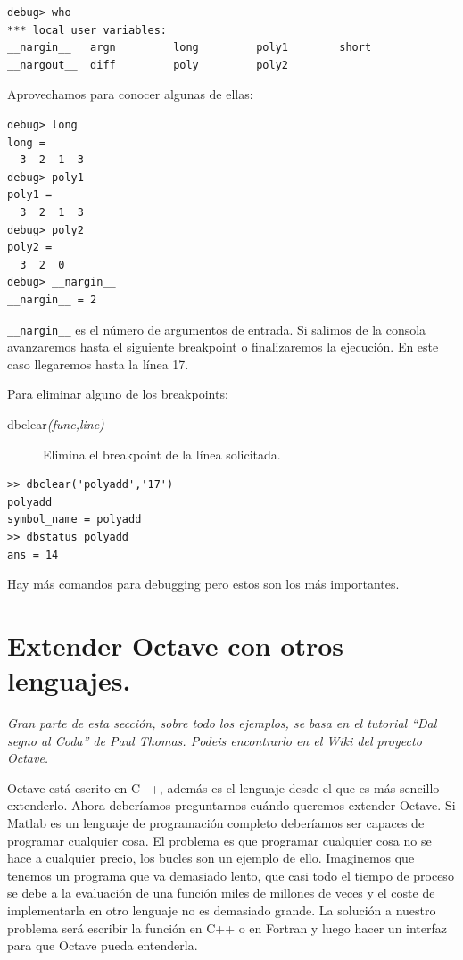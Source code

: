   \begin{verbatim}
debug> who
*** local user variables:
__nargin__   argn         long         poly1        short
__nargout__  diff         poly         poly2
\end{verbatim}
Aprovechamos para conocer algunas de ellas:

  \begin{verbatim}
debug> long
long =
  3  2  1  3
debug> poly1
poly1 =
  3  2  1  3
debug> poly2
poly2 =
  3  2  0
debug> __nargin__
__nargin__ = 2
\end{verbatim}
\texttt{\_\_nargin\_\_} es el número de argumentos de entrada. Si
salimos de la consola avanzaremos hasta el siguiente breakpoint o
finalizaremos la ejecución. En este caso llegaremos hasta la línea 17.

Para eliminar alguno de los breakpoints:

\begin{description}
\item [{dbclear\textsl{(func,line)}}]Elimina el
  breakpoint de la línea solicitada.
\end{description}
\begin{verbatim}
>> dbclear('polyadd','17')
polyadd
symbol_name = polyadd
>> dbstatus polyadd
ans = 14
\end{verbatim}
Hay más comandos para debugging pero estos son los más importantes.


\section{Extender Octave con otros
  lenguajes.\label{sec:Extender-Octave-con}}

\emph{Gran parte de esta sección, sobre todo los ejemplos, se basa en
  el tutorial {}``Dal segno al Coda'' de Paul Thomas. Podeis
  encontrarlo en el Wiki del proyecto Octave.}

Octave está escrito en C++, además es el lenguaje desde el que es más
sencillo extenderlo. Ahora deberíamos preguntarnos cuándo queremos
extender Octave. Si Matlab es un lenguaje de programación completo
deberíamos ser capaces de programar cualquier cosa. El problema es que
programar cualquier cosa no se hace a cualquier precio, los bucles son
un ejemplo de ello. Imaginemos que tenemos un programa que va
demasiado lento, que casi todo el tiempo de proceso se debe a la
evaluación de una función miles de millones de veces y el coste de
implementarla en otro lenguaje no es demasiado grande. La solución a
nuestro problema será escribir la función en C++ o en Fortran y luego
hacer un interfaz para que Octave pueda entenderla.

